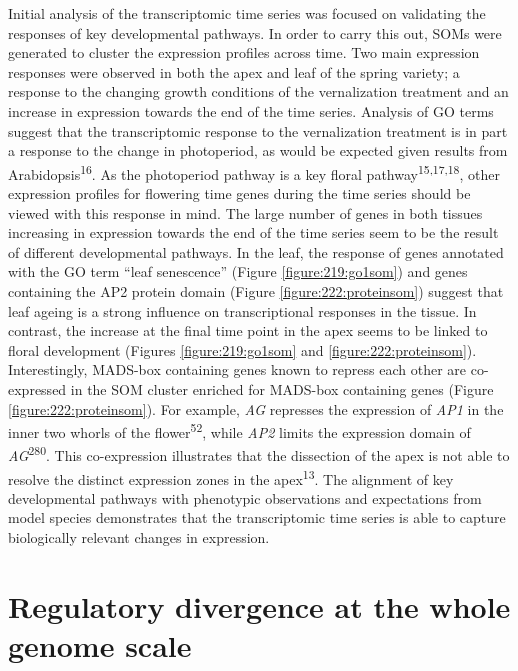 \documentclass[12pt,]{book}
\begin{document}
Initial analysis of the transcriptomic time series was focused on
validating the responses of key developmental pathways. In order to
carry this out, SOMs were generated to cluster the expression profiles
across time. Two main expression responses were observed in both the
apex and leaf of the spring variety; a response to the changing growth
conditions of the vernalization treatment and an increase in expression
towards the end of the time series. Analysis of GO terms suggest that
the transcriptomic response to the vernalization treatment is in part a
response to the change in photoperiod, as would be expected given
results from Arabidopsis\textsuperscript{16}. As the photoperiod pathway
is a key floral pathway\textsuperscript{15,17,18}, other expression
profiles for flowering time genes during the time series should be
viewed with this response in mind. The large number of genes in both
tissues increasing in expression towards the end of the time series seem
to be the result of different developmental pathways. In the leaf, the
response of genes annotated with the GO term ``leaf senescence'' (Figure
\ref{figure:219:go1som}) and genes containing the AP2 protein domain
(Figure \ref{figure:222:proteinsom}) suggest that leaf ageing is a
strong influence on transcriptional responses in the tissue. In
contrast, the increase at the final time point in the apex seems to be
linked to floral development (Figures \ref{figure:219:go1som} and
\ref{figure:222:proteinsom}). Interestingly, MADS-box containing genes
known to repress each other are co-expressed in the SOM cluster enriched
for MADS-box containing genes (Figure \ref{figure:222:proteinsom}). For
example, \emph{AG} represses the expression of \emph{AP1} in the inner
two whorls of the flower\textsuperscript{52}, while \emph{AP2} limits
the expression domain of \emph{AG}\textsuperscript{280}. This
co-expression illustrates that the dissection of the apex is not able to
resolve the distinct expression zones in the apex\textsuperscript{13}.
The alignment of key developmental pathways with phenotypic observations
and expectations from model species demonstrates that the transcriptomic
time series is able to capture biologically relevant changes in
expression.

\section{Regulatory divergence at the whole genome
scale}\label{section:spring:genomedivergence}
\end{document}
